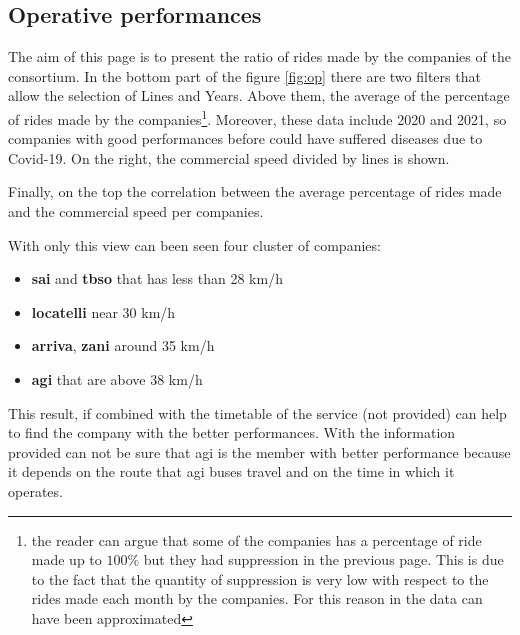 \newpage
\begin{landscape}
\thispagestyle{empty}

\end{landscape}
\newpage

\subsection{Operative performances}
The aim of this page is to present the ratio of rides made by the companies of the consortium. 
In the bottom part of the figure \ref{fig:op} there are two filters that allow the selection of Lines and Years.
Above them,  the average of the percentage of rides made by the companies\footnote{the reader can argue that some of the companies has a percentage of ride made up to $100\%$ but they had suppression in the previous page. This is due to the fact that the quantity of suppression is very low with respect to the rides made each month by the companies. For this reason in the data can have been approximated}. Moreover, these data include 2020 and 2021, so companies with good performances before could have suffered diseases due to Covid-19. On the right, the commercial speed divided by lines is shown.

Finally, on the top the correlation between the average percentage of rides made and the commercial speed per companies.

With only this view can been seen four cluster of companies:
\begin{itemize}
    \item \textbf{sai} and \textbf{tbso} that has less than 28 km/h
    \item \textbf{locatelli} near 30 km/h
    \item \textbf{arriva}, \textbf{zani} around 35 km/h
    \item \textbf{agi} that are above 38 km/h 
\end{itemize}
This result, if combined with the timetable of the service (not provided) can help to find the company with the better performances. With the information provided can not be sure that agi is the member with better performance because it depends on the route that agi buses travel and on the time in which it operates. 



\newpage
\begin{landscape}
\thispagestyle{empty}

\end{landscape}
\newpage

